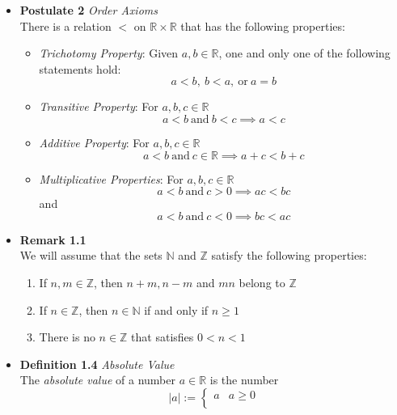 \documentclass[11pt,a4paper]{article}
\begin{document}
\begin{itemize}
    \item \textbf{Postulate 2} \emph{Order Axioms} \\
        There is a relation $<$ on $\mathbb{R} \times \mathbb{R}$ that has the following
        properties:
        \begin{itemize}
            \item \emph{Trichotomy Property}:
                Given $a, b \in \mathbb{R}$, one and only one of the following statements hold:
                \[
                    a < b, \ b < a, \ \text{or} \ a = b
                \]
            \item \emph{Transitive Property}:
                For $a, b, c \in \mathbb{R}$
                \[
                    a < b \ \text{and} \ b < c \implies a < c
                \]
            \item \emph{Additive Property}:
                For $a, b, c \in \mathbb{R}$
                \[
                    a < b \ \text{and} \ c \in \mathbb{R} \implies a + c < b + c
                \]
            \item \emph{Multiplicative Properties}:
                For $a, b, c \in \mathbb{R}$
                \[
                    a < b \ \text{and} \ c > 0 \implies ac < bc
                \]
                and
                \[
                    a < b \ \text{and} \ c < 0 \implies bc < ac
                \]
        \end{itemize}
    \item \textbf{Remark 1.1} \\
        We will assume that the sets $\mathbb{N}$ and $\mathbb{Z}$ satisfy the following
        properties:
        \begin{enumerate}
            \item If $n, m \in \mathbb{Z}$, then $n + m, n - m$ and $mn$ belong to $\mathbb{Z}$
            \item If $n \in \mathbb{Z}$, then $n \in \mathbb{N}$ if and only if $n \geq 1$
            \item There is no $n \in \mathbb{Z}$ that satisfies $0 < n < 1$
        \end{enumerate}
    \item \textbf{Definition 1.4} \emph{Absolute Value} \\
        The \emph{absolute value} of a number $a \in \mathbb{R}$ is the number
        \[
            |a| :=
            \begin{cases}{}
                a  & a \geq 0 \\

\end{cases}\]
\end{itemize}
\end{document}
